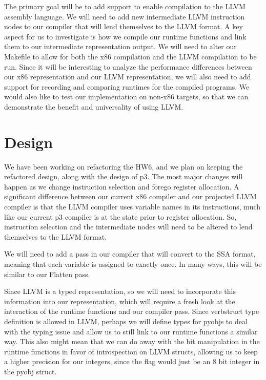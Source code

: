 \documentclass[11pt]{article}
\begin{document}
The primary goal will be to add support to enable compilation to the LLVM assembly language. 
We will need to add new intermediate LLVM instruction nodes to our compiler that will lend themselves to 
the LLVM format. A key aspect for us to investigate is how we compile our runtime
functions and link them to our intermediate representation output.
We will need to alter our Makefile to allow for both the x86 compilation and the LLVM
compilation to be run. Since it will be interesting to analyze the performance differences 
between our x86 representation and our LLVM representation, we will also need to
add support for recording and comparing runtimes for the compiled programs. 
We would also like to test our implementation on non-x86 targets, so that we can demonstrate
the benefit and universality of using LLVM.

\section{Design}

We have been working on refactoring the HW6, and we plan on keeping the refactored
design, along with the design of p3. The most major changes will happen as we change 
instruction selection and forego register allocation. A significant difference between
our current x86 compiler and our projected LLVM compiler is that the LLVM compiler 
uses variable names in its instructions, much like our current p3 compiler is at the state
prior to register allocation. So, instruction selection and the intermediate nodes will need to be
altered to lend themselves to the LLVM format. 

We will need to add a pass in our compiler that will convert to the SSA format, meaning
that each variable is assigned to exactly once. In many ways, this will be similar to our Flatten pass.

Since LLVM is a typed representation, so we will need to incorporate this information into 
our representation, which will require a fresh look at the interaction of the runtime functions 
and our compiler pass. Since verb{struct} type definition is allowed in LLVM, perhaps we will define types
for pyobjs to deal with the typing issue and allow us to still link to our runtime functions a similar way.
This also might mean that we can do away with the bit manipulation in the runtime functions in favor of 
introspection on LLVM structs, allowing us to keep a higher precision for our integers, since the flag would
just be an 8 bit integer in the pyobj struct.
\end{document}

